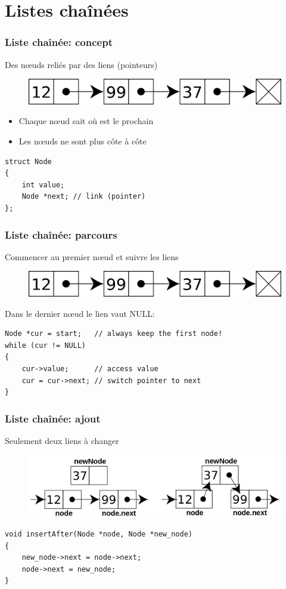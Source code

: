 \documentclass[12pt]{beamer}
\begin{document}
\section{Listes chaînées}

\begin{frame}[fragile]
\frametitle{Liste chaînée: concept}
Des nœuds reliés par des liens (pointeurs)
\begin{figure}
\centering
\includegraphics[width=.8\textwidth]{img/singly-linked}
\end{figure}
\begin{itemize}
\item Chaque nœud sait où est le prochain
\item Les nœuds ne sont plus côte à côte
\end{itemize}
\begin{lstlisting}
struct Node
{
    int value;
    Node *next; // link (pointer)
};
\end{lstlisting}
\end{frame}

\begin{frame}[fragile]
\frametitle{Liste chaînée: parcours}
Commencer au premier nœud et suivre les liens
\begin{figure}
\centering
\includegraphics[width=.6\textwidth]{img/singly-linked}
\end{figure}
Dans le dernier nœud le lien vaut NULL:
\begin{lstlisting}
Node *cur = start;   // always keep the first node!
while (cur != NULL)
{
    cur->value;      // access value
    cur = cur->next; // switch pointer to next
}
\end{lstlisting}
\end{frame}

\begin{frame}[fragile]
\frametitle{Liste chaînée: ajout}
Seulement deux liens à changer
\begin{figure}
\centering
\includegraphics[width=.9\textwidth]{img/insert-node}
\end{figure}
\begin{lstlisting}
void insertAfter(Node *node, Node *new_node)
{
    new_node->next = node->next;
    node->next = new_node;
}
\end{lstlisting}
\end{frame}
\end{document}
